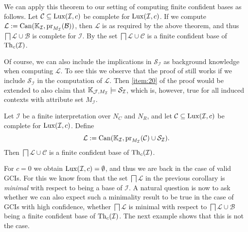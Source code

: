 We can apply this theorem to our setting of computing finite confident bases as follows.
Let $\mathcal{C} \subseteq \operatorname{Lux}(\mathcal{I}, c)$ be complete for $\operatorname{Lux}(\mathcal{I}, c)$.
If we compute $\mathcal{L} := \operatorname{Can}({\mathbb{K}}_{\mathcal{I}},
\operatorname{pr}_{M_{\mathcal{I}}}(\mathcal{B}))$, then $\mathcal{L}$ is as required by the above
theorem, and thus $\bigsqcap \mathcal{L} \cup \mathcal{B}$ is complete for $\mathcal{I}$.
By  the set $\bigsqcap \mathcal{L} \cup
\mathcal{C}$ is a finite confident base of $\operatorname{Th}_c(\mathcal{I})$.

Of course, we can also include the implications in $\mathcal{S}_{\mathcal{I}}$ as
background knowledge when computing $\mathcal{L}$.  To see this we observe that the proof
of  still works if we include
$\mathcal{S}_{\mathcal{I}}$ in the computation of $\mathcal{L}$.  Then \cref{item:20} of
the proof would be extended to also claim that ${\mathbb{K}}_{\mathcal{J}, M_{\mathcal{I}}}
\models \mathcal{S}_{\mathcal{I}}$, which is, however, true for all induced contexts with
attribute set $M_{\mathcal{I}}$.

\begin{Corollary}
  \label{cor:gci-completion-with-S_I}
  Let $\mathcal{I}$ be a finite interpretation over $N_C$ and $N_R$, and let $\mathcal{C}
  \subseteq \operatorname{Lux}(\mathcal{I}, c)$ be complete for $\operatorname{Lux}(\mathcal{I}, c)$.  Define
  \begin{equation*}
    \mathcal{L} := \operatorname{Can}({\mathbb{K}}_{\mathcal{I}}, \operatorname{pr}_{M_{\mathcal{I}}}(\mathcal{C}) \cup \mathcal{S}_{\mathcal{I}}).
  \end{equation*}
  Then $\bigsqcap \mathcal{L} \cup \mathcal{C}$ is a finite confident base of
  $\operatorname{Th}_c(\mathcal{I})$.
\end{Corollary}

For $c = 0$ we obtain $\operatorname{Lux}(\mathcal{I}, c) = \emptyset$, and thus we are back in the case
of valid GCIs.  For this we know from  that the set $\bigsqcap
\mathcal{L}$ in the previous corollary is \emph{minimal} with respect to being a base of
$\mathcal{I}$.  A natural question is now to ask whether we can also expect such a
minimality result to be true in the case of GCIs with high confidence, \ie whether
$\bigsqcap \mathcal{L}$ is minimal with respect to $\bigsqcap \mathcal{L} \cup
\mathcal{B}$ being a finite confident base of $\operatorname{Th}_c(\mathcal{I})$.  The next example
shows that this is not the case.

